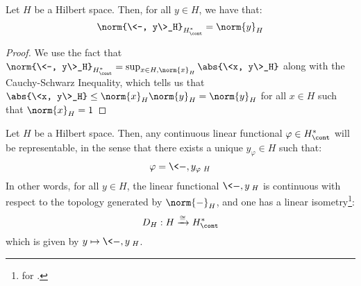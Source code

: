         \begin{lemma} \label{lemma: norms_of_dual_elements_in_hilbert_spaces}
            Let $H$ be a Hilbert space. Then, for all $y \in H$, we have that:
                $$\norm{\<-, y\>_H}_{H^*_{\cont}} = \norm{y}_H$$
        \end{lemma}
            \begin{proof}
                We use the fact that $\norm{\<-, y\>_H}_{H^*_{\cont}} = \sup_{x \in H, \norm{x}_H} \abs{\<x, y\>_H}$ along with the Cauchy-Schwarz Inequality, which tells us that $\abs{\<x, y\>_H} \leq \norm{x}_H \norm{y}_H = \norm{y}_H$ for all $x \in H$ such that $\norm{x}_H = 1$
            \end{proof}
        \begin{theorem} \label{theorme: riesz_representation_theorem}
            Let $H$ be a Hilbert space. Then, any continuous linear functional $\varphi \in H^*_{\cont}$ will be representable, in the sense that there exists a unique $y_{\varphi} \in H$ such that:
                $$\varphi = \<-, y_{\varphi}\>_H$$
            In other words, for all $y \in H$, the linear functional $\<-, y\>_H$ is continuous with respect to the topology generated by $\norm{-}_H$, and one has a linear isometry\footnote{ for .}:
                $$D_H: H \xrightarrow[]{\cong} H^*_{\cont}$$
            which is given by $y \mapsto \<-, y\>_H$.
        \end{theorem}
